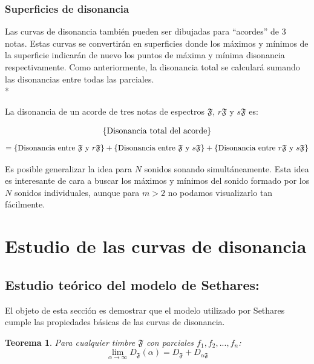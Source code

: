 \documentclass[11pt,a4paper]{article}
\newtheorem{teor}{Teorema}
\begin{document}
    \subsubsection{Superficies de disonancia}
    
    Las curvas de disonancia también pueden ser dibujadas para ``acordes'' de $3$ notas. Estas curvas se convertirán en superficies donde los máximos y mínimos de la superficie indicarán de nuevo los puntos de máxima y mínima disonancia respectivamente. Como anteriormente, la disonancia total se calculará sumando las disonancias entre todas las parciales. \\*
    
    La disonancia de un acorde de tres notas de espectros $\mathfrak{F}$, $r\mathfrak{F}$ y $s\mathfrak{F}$ es:
    
    $$
        \{\hbox{Disonancia total del acorde}\} 
    $$
    $$
    = \{\hbox{Disonancia entre } \mathfrak{F} \hbox{ y } r\mathfrak{F}\} +\{\hbox{Disonancia entre } \mathfrak{F} \hbox{ y } s\mathfrak{F}\} +\{\hbox{Disonancia entre } r\mathfrak{F} \hbox{ y } s\mathfrak{F}\} 
    $$
    
    Es posible generalizar la idea para $N$ sonidos sonando simultáneamente. Esta idea es interesante de cara a buscar los máximos y mínimos del sonido formado por los $N$ sonidos individuales, aunque para $m>2$ no podamos visualizarlo tan fácilmente.
    

	\newpage
	

\section{Estudio de las curvas de disonancia}
    
    	


	\subsection{Estudio teórico del modelo de Sethares:}
	El objeto de esta sección es demostrar que el modelo utilizado por Sethares cumple las propiedades básicas de las curvas de disonancia.
	
	\begin{teor}                      %
	Para cualquier timbre $\mathfrak{F}$ con parciales $f_1, f_2,... , f_n$: $$\lim_{\alpha \rightarrow \infty}{D_{\mathfrak{F}}(\alpha)} = D_{\mathfrak{F}} + D_{\alpha \mathfrak{F}}$$ 
	\end{teor}
	
\end{document}
